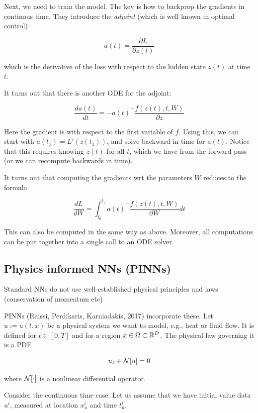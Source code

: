 \documentclass[english]{article}
\begin{document}
\item Next, we need to train the model. The key is how to backprop the gradients in continous time. They introduce the \emph{adjoint} (which is well known in optimal control)

$$a(t) = \frac{\partial L}{\partial z(t)}$$

which is the derivative of the loss with respect to the hidden state $z(t)$ at time $t$.

\item It turns out that there is another ODE for the adjoint: 

$$\frac{da(t)}{dt} = -a(t)^\top  \frac{f(z(t),t,W)}{\partial z} $$

Here the gradient is with respect to the first variable of $f$. Using this, we can start with $a(t_1) = L'(z(t_1))$, and solve backward in time for $a(t)$. Notice that this requires knowing $z(t)$ for all $t$, which we have from the forward pass (or we can recompute backwards in time).

\item It turns out that computing the gradients wrt the parameters $W$ reduces to the formula

$$\frac{dL}{dW} = \int_{t_0}^{t_1}  a(t)^\top  \frac{f(z(t),t,W)}{\partial W} dt$$

This can also be computed in the same way as above. Moreover, all computations can be put together into a single call to an ODE solver.
\eitem 


\subsection{Physics informed NNs (PINNs)}
%
\bitem
\item Standard NNs do not use well-established physical principles and laws (conservation of momentum etc)

\item PINNs (Raissi, Perdikaris, Karniadakis, 2017) incorporate these. Let $u:=u(t,x)$ be a physical system we want to model, e.g., heat or fluid flow. It is defined for $t\in[0,T]$ and for a region $x\in\Omega\subset \mathbb{R}^D$. The physical law governing it is a PDE

$$u_t +\mathcal{N}[u]=0$$

where $\mathcal{N}[\cdot]$ is a nonlinear differential operator.

\item Consider the continuous time case. Let us assume that we have initial value data $u^i$, measured at location $x_u^i$ and time $t_u^i$. 
\end{document}
